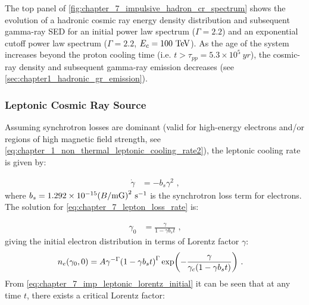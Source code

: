 The top panel of \autoref{fig:chapter_7_impulsive_hadron_cr_spectrum} shows the evolution of a hadronic cosmic ray energy density distribution and subsequent gamma-ray SED for an initial power law spectrum ($\Gamma=2.2$) and an exponential cutoff power law spectrum ($\Gamma=2.2$, $E_c=100~\TeV$). As the age of the system increases beyond the proton cooling time (i.e. $t>\tau_{pp}=5.3\times 10^5~\si{yr}$), the cosmic-ray density and subsequent gamma-ray emission decreases (see \autoref{sec:chapter1_hadronic_gr_emission}).

\subsubsection{Leptonic Cosmic Ray Source}

Assuming synchrotron losses are dominant (valid for high-energy electrons and/or regions of high magnetic field strength, see \autoref{eq:chapter_1_non_thermal_leptonic_cooling_rate2}), the leptonic cooling rate is given by:

\begin{equation}
    \begin{aligned}
        \dot{\gamma}&=-b_s\gamma^2 \text{ ,}
    \end{aligned}\label{eq:chapter_7_lepton_loss_rate}
\end{equation}
\noindent where $b_s = 1.292 \times 10^{-15} \qty(B/\si{\milli G})^2~\si{\per\second}$ is the synchrotron loss term for electrons. The solution for \autoref{eq:chapter_7_lepton_loss_rate} is:

\begin{equation}
	\begin{aligned}
		\gamma_0&=\frac{\gamma}{1-\gamma b_s t} \text{ ,}
	\end{aligned} \label{eq:chapter_7_imp_leptonic_lorentz_initial}
\end{equation}
\noindent giving the initial electron distribution in terms of Lorentz factor $\gamma$:
\begin{equation}
    \begin{aligned}
        n_e\qty(\gamma_0,0)&=A\gamma^{-\Gamma}\qty(1-\gamma b_s t)^{\Gamma}\exp(-\frac{\gamma}{\gamma_c\qty(1-\gamma b_st)})\text{ .} 
    \end{aligned} \label{eq:chapter_7_imp_leptonic_cr_initial_distrib}
\end{equation}
\noindent From \autoref{eq:chapter_7_imp_leptonic_lorentz_initial} it can be seen that at any time $t$, there exists a critical Lorentz factor:

